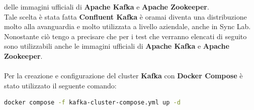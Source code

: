delle immagini ufficiali di \textbf{Apache Kafka} e \textbf{Apache Zookeeper}. \\
Tale scelta è stata fatta \textbf{Confluent Kafka} è oramai diventa una distribuzione molto alla avanguardia e molto utilizzata 
a livello aziendale, anche in Sync Lab. \\
Nonostante ciò tengo a precisare che per i test che verranno elencati di seguito
sono utilizzabili anche le immagini ufficiali di \textbf{Apache Kafka} e \textbf{Apache Zookeeper}.\\
\\
Per la creazione e configurazione del \gls{cluster}{} \textbf{Kafka} con \textbf{Docker Compose} è stato utilizzato il seguente comando:
\begin{lstlisting}[language=bash]
    docker compose -f kafka-cluster-compose.yml up -d
\end{lstlisting}
